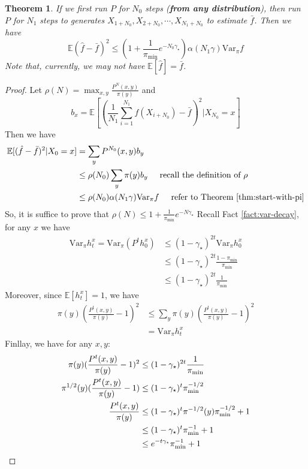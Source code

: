 \documentclass{article}
\newtheorem{theorem}{Theorem}[section]
\begin{document}
\begin{theorem}
  If we first run $P$ for $N_0$ steps (\textbf{from any distribution}), then run $P$ for $N_1$ steps to generates $X_{1+N_0}, X_{2+N_0}, \cdots, X_{N_1+N_0}$ to estimate $\bar{f}$. Then we have
  \[\mathbb{E}(\hat{f} - \bar{f})^2 \leq (1 + \frac{1}{\pi_{\min}} e^{-N_0\gamma_\star}) \alpha(N_1\gamma)\mathrm{Var}_\pi f\]
  Note that, currently, we may not have $\mathbb{E}[\hat{f}] = \bar{f}$.
\end{theorem}
\begin{proof}
  Let $\rho(N) = \max_{x,y} \frac{P^N(x,y)}{\pi(y)}$ and
  \[b_x = \mathbb{E}\left[(\frac{1}{N_1}\sum_{i=1}^{N_1}f(X_{i+N_0}) - \bar{f})^2 | X_{N_0} = x\right]\]
  Then we have
  \begin{align*}
    \mathbb{E}[(\hat{f} - \bar{f})^2 | X_0 = x]
    &= \sum_y P^{N_0}(x, y) b_y \\
    &\leq \rho(N_0) \sum_y \pi(y)b_y \hspace{0.5cm} \mbox{recall the definition of $\rho$} \\
    &\leq \rho(N_0) \alpha(N_1\gamma)\mathrm{Var}_\pi f \hspace{0.5cm} \mbox{refer to Theorem \ref{thm:start-with-pi}}
  \end{align*}
  So, it is suffice to prove that $\rho(N) \leq 1 + \frac{1}{\pi_{\min}} e^{-N\gamma_\star}$
  Recall Fact \ref{fact:var-decay}, for any $x$ we have
  \begin{align*}
    \mathrm{Var}_\pi h_t^x = \mathrm{Var}_\pi(P^th_0^x) 
    &\leq (1 - \gamma_\star)^{2t}\mathrm{Var}_\pi h_0^x \\
    &\leq (1 - \gamma_\star)^{2t} \frac{1 - \pi_{\min}}{\pi_{\min}} \\
    &\leq (1 - \gamma_\star)^{2t} \frac{1}{\pi_{\min}}
  \end{align*}
  Moreover, since $\mathbb{E}[h_t^x] = 1$, we have
  \begin{align*}
    \pi(y)(\frac{P^t(x, y)}{\pi(y)} - 1)^2
    &\leq \sum_y \pi(y) (\frac{P^t(x, y)}{\pi(y)} - 1)^2 \\
    &= \mathrm{Var}_\pi h_t^x
  \end{align*}
  Finllay, we have for any $x, y$:
  \begin{align*}
    \pi(y)(\frac{P^t(x, y)}{\pi(y)} - 1)^2
    &\leq (1 - \gamma_\star)^{2t}\frac{1}{\pi_{\min}} \\
    \pi^{1/2}(y) (\frac{P^t(x, y)}{\pi(y)} - 1) &\leq (1 - \gamma_\star)^t \pi^{-1/2}_{\min} \\
    \frac{P^t(x, y)}{\pi(y)}
    &\leq (1 - \gamma_\star)^t \pi^{-1/2}(y)\pi^{-1/2}_{\min} + 1 \\
    &\leq (1 - \gamma_\star)^t \pi^{-1}_{\min} + 1 \\
    &\leq e^{-t\gamma_\star} \pi^{-1}_{\min} + 1 \qedhere
  \end{align*}
\end{proof}

\clearpage


\end{document}
